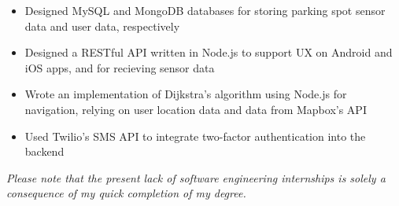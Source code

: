 \documentclass[10pt]{article}
\begin{document}
\begin{flushleft}
\begin{leftli}
			\begin{itemize}
				\item Designed MySQL and MongoDB databases for storing parking spot sensor data and user data, respectively
				\vspace{-2mm}
				\item Designed a RESTful API written in Node.js to support UX on Android and iOS apps, and for recieving sensor data
				\vspace{-2mm}
				\item Wrote an implementation of Dijkstra's algorithm using Node.js for navigation, relying on user location data and data from Mapbox's API
				\vspace{-2mm}
				\item Used Twilio's SMS API to integrate two-factor authentication into the backend
			\end{itemize}
		\end{leftli}
		\vspace{-1mm}
		{\footnotesize \textit{Please note that the present lack of software engineering internships is solely a consequence of my quick completion of my degree.}}

	
	


\end{flushleft}
\end{document}
